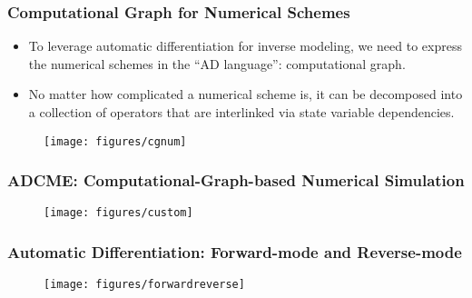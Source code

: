\documentclass[usenames,dvipsnames]{beamer}
\begin{document}
\begin{frame}
	\frametitle{Computational Graph for Numerical Schemes}
	
	\begin{itemize}
		\item To leverage automatic differentiation for inverse modeling, we need to express the numerical schemes in the ``AD language'': computational graph. 
		\item No matter how complicated a numerical scheme is, it can be decomposed into a collection of operators that are interlinked via state variable dependencies. 
	\end{itemize}
	
	\begin{figure}[hbt]
  \texttt{[image: figures/cgnum]}
\end{figure}

	
	
\end{frame}


\begin{frame}
	\frametitle{ADCME: Computational-Graph-based Numerical Simulation}

		\begin{figure}[hbt]
  \texttt{[image: figures/custom]}
\end{figure}
\end{frame}


\begin{frame}
	\frametitle{Automatic Differentiation: Forward-mode and Reverse-mode}
	\begin{figure}
		\centering
		\texttt{[image: figures/forwardreverse]}
	\end{figure}
\end{frame}
\end{document}
